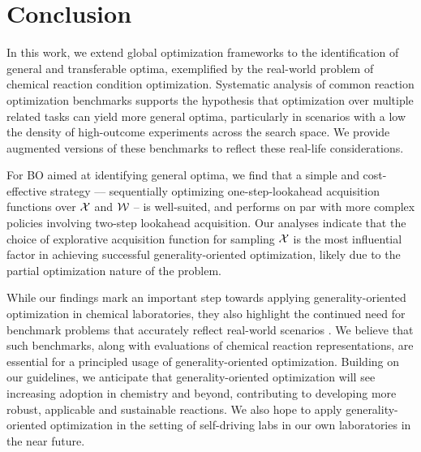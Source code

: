 \section{Conclusion}

In this work, we extend global optimization frameworks to the identification of general and transferable optima, exemplified by the real-world problem of chemical reaction condition optimization.
Systematic analysis of common reaction optimization benchmarks supports the hypothesis that optimization over multiple related tasks can yield more general optima, particularly in scenarios with a low the density of high-outcome experiments across the search space. We provide augmented versions of these benchmarks to reflect these real-life considerations. 

For BO aimed at identifying general optima, we find that a simple and cost-effective strategy –– sequentially optimizing one-step-lookahead acquisition functions over ${\mathcal{X}}$ and ${\mathcal{W}}$ -- is well-suited, and performs on par with more complex policies involving two-step lookahead acquisition. Our analyses indicate that the choice of explorative acquisition function for sampling ${\mathcal{X}}$ is the most influential factor in achieving successful generality-oriented optimization, likely due to the partial optimization nature of the problem.

While our findings mark an important step towards applying generality-oriented optimization in chemical laboratories, they also highlight the continued need for benchmark problems that accurately reflect real-world scenarios \citep{liang_benchmarking_2021}. We believe that such benchmarks, along with evaluations of chemical reaction representations, are essential for a principled usage of generality-oriented optimization. 
Building on our guidelines, we anticipate that generality-oriented optimization will see increasing adoption in chemistry and beyond, contributing to developing more robust, applicable and sustainable reactions.
We also hope to apply generality-oriented optimization in the setting of self-driving labs in our own laboratories in the near future.